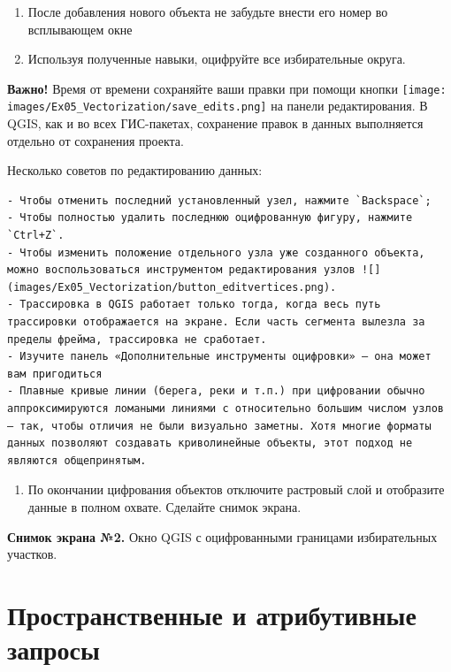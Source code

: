 \documentclass[
  12pt,
]{book}
\providecommand{\tightlist}{%
  \setlength{\itemsep}{0pt}\setlength{\parskip}{0pt}}
\begin{document}
\begin{enumerate}
\def\labelenumi{\arabic{enumi}.}
\setcounter{enumi}{12}
\item
  После добавления нового объекта не забудьте внести его номер во всплывающем окне
\item
  Используя полученные навыки, оцифруйте все избирательные округа.
\end{enumerate}

\textbf{Важно!} Время от времени сохраняйте ваши правки при помощи кнопки \texttt{[image: images/Ex05\_Vectorization/save\_edits.png]} на панели редактирования. В QGIS, как и во всех ГИС-пакетах, сохранение правок в данных выполняется отдельно от сохранения проекта.

Несколько советов по редактированию данных:

\begin{verbatim}
- Чтобы отменить последний установленный узел, нажмите `Backspace`;
- Чтобы полностью удалить последнюю оцифрованную фигуру, нажмите `Ctrl+Z`.
- Чтобы изменить положение отдельного узла уже созданного объекта, можно воспользоваться инструментом редактирования узлов ![](images/Ex05_Vectorization/button_editvertices.png).
- Трассировка в QGIS работает только тогда, когда весь путь трассировки отображается на экране. Если часть сегмента вылезла за пределы фрейма, трассировка не сработает.
- Изучите панель «Дополнительные инструменты оцифровки» — она может вам пригодиться
- Плавные кривые линии (берега, реки и т.п.) при цифровании обычно аппроксимируются ломаными линиями с относительно большим числом узлов — так, чтобы отличия не были визуально заметны. Хотя многие форматы данных позволяют создавать криволинейные объекты, этот подход не являются общепринятым.
\end{verbatim}

\begin{enumerate}
\def\labelenumi{\arabic{enumi}.}
\setcounter{enumi}{17}
\tightlist
\item
  По окончании цифрования объектов отключите растровый слой и отобразите данные в полном охвате. Сделайте снимок экрана.
\end{enumerate}

\textbf{Снимок экрана №2.} Окно QGIS с оцифрованными границами избирательных участков.

\hypertarget{digitizing-query}{%
\section{Пространственные и атрибутивные запросы}\label{digitizing-query}}
\end{document}
